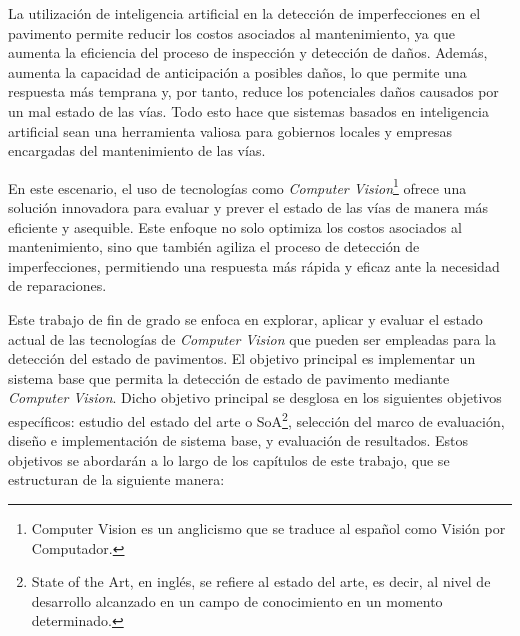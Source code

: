 La utilización de inteligencia artificial en la detección de imperfecciones en el pavimento permite reducir los costos asociados al mantenimiento, ya que aumenta la eficiencia del proceso de inspección y detección de daños. Además, aumenta la capacidad de anticipación a posibles daños, lo que permite una respuesta más temprana y, por tanto, reduce los potenciales daños causados por un mal estado de las vías. Todo esto hace que sistemas basados en inteligencia artificial sean una herramienta valiosa para gobiernos locales y empresas encargadas del mantenimiento de las vías.

En este escenario, el uso de tecnologías como \textit{Computer Vision}\footnote{Computer Vision es un anglicismo que se traduce al español como Visión por Computador.} ofrece una solución innovadora para evaluar y prever el estado de las vías de manera más eficiente y asequible. Este enfoque no solo optimiza los costos asociados al mantenimiento, sino que también agiliza el proceso de detección de imperfecciones, permitiendo una respuesta más rápida y eficaz ante la necesidad de reparaciones.

Este trabajo de fin de grado se enfoca en explorar, aplicar y evaluar el estado actual de las tecnologías de \textit{Computer Vision} que pueden ser empleadas para la detección del estado de pavimentos. El objetivo principal es implementar un sistema base que permita la detección de estado de pavimento mediante \textit{Computer Vision}. Dicho objetivo principal se desglosa en los siguientes objetivos específicos: estudio del estado del arte o SoA\footnote{State of the Art, en inglés, se refiere al estado del arte, es decir, al nivel de desarrollo alcanzado en un campo de conocimiento en un momento determinado.}, selección del marco de evaluación, diseño e implementación de sistema base, y evaluación de resultados. Estos objetivos se abordarán a lo largo de los capítulos de este trabajo, que se estructuran de la siguiente manera:

